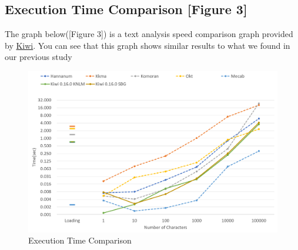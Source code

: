 \documentclass{article}
\begin{document}
\subsection{Execution Time Comparison [Figure 3]}
The graph below([Figure 3]) is a text analysis speed comparison graph provided by \href{https://github.com/bab2min/Kiwi?tab=readme-ov-file}{Kiwi}. You can see that this graph shows similar results to what we found in our previous study

\begin{figure}
    \centering
    \includegraphics[width=0.6\linewidth]{compare_speed.png}
    \caption{Execution Time Comparison}
    \label{fig:enter-label}
\end{figure}
\end{document}
